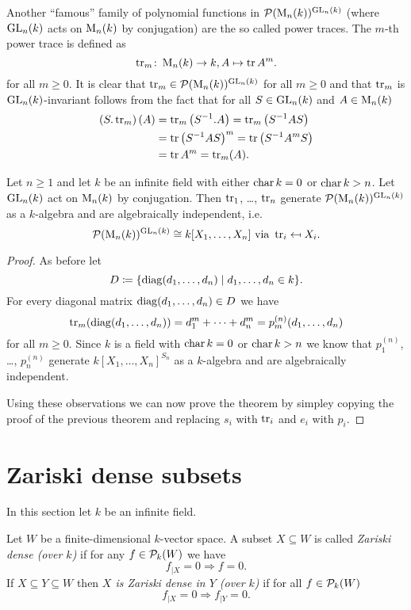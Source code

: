 Another ``famous'' family of polynomial functions in $\mathcal{P}(\operatorname{M}_n(k))^{\operatorname{GL}_n(k)}$ (where $\operatorname{GL}_n(k)$ acts on $\operatorname{M}_n(k)$ by conjugation) are the so called power traces. The $m$-th power trace is defined as
\[
  \operatorname{tr}_m \colon \operatorname{M}_n(k) \to k, A \mapsto \operatorname{tr} A^m.
\]
for all $m \geq 0$. It is clear that $\operatorname{tr}_m \in \mathcal{P}(\operatorname{M}_n(k))^{\operatorname{GL}_n(k)}$ for all $m \geq 0$ and that $\operatorname{tr}_m$ is $\operatorname{GL}_n(k)$-invariant follows from the fact that for all $S \in \operatorname{GL}_n(k)$ and $A \in \operatorname{M}_n(k)$
\begin{align*}
  \left(S.\operatorname{tr}_m\right)(A)
  &= \operatorname{tr}_m\left(S^{-1}.A\right)
  = \operatorname{tr}_m\left(S^{-1} A S\right) \\
  &= \operatorname{tr} \left(S^{-1} A S\right)^m
  = \operatorname{tr} \left(S^{-1} A^m S\right) \\
  &= \operatorname{tr} A^m
  = \operatorname{tr}_m(A).
\end{align*}


\begin{thrm}
  Let $n \geq 1$ and let $k$ be an infinite field with either $\operatorname{char} k = 0$ or $\operatorname{char} k > n$. Let $\operatorname{GL}_n(k)$ act on $\operatorname{M}_n(k)$ by conjugation. Then $\operatorname{tr}_1$, \dots, $\operatorname{tr}_n$ generate $\mathcal{P}(\operatorname{M}_n(k))^{\operatorname{GL}_n(k)}$ as a $k$-algebra and are algebraically independent, i.e.\
  \[
    \mathcal{P}(\operatorname{M}_n(k))^{\operatorname{GL}_n(k)} \cong k[X_1, \dotsc, X_n] \text{ via } \operatorname{tr}_i \mapsfrom X_i.
  \]
\end{thrm}
\begin{proof}
  As before let 
  \[
    D \coloneqq \{\operatorname{diag}(d_1, \dotsc, d_n) \mid d_1, \dotsc, d_n \in k\}.
  \]
  For every diagonal matrix $\operatorname{diag}(d_1, \dotsc, d_n) \in D$ we have
  \[
    \operatorname{tr}_m(\operatorname{diag}(d_1, \dotsc, d_n)) = d_1^m + \dotsb + d_n^m = p^{(n)}_m(d_1, \dotsc, d_n)
  \]
  for all $m \geq 0$. Since $k$ is a field with $\operatorname{char} k = 0$ or $\operatorname{char} k > n$ we know that $p^{(n)}_1$, \dots, $p^{(n)}_n$ generate $k[X_1, \dotsc, X_n]^{S_n}$ as a $k$-algebra and are algebraically independent.
  
  Using these observations we can now prove the theorem by simpley copying the proof of the previous theorem and replacing $s_i$ with $\operatorname{tr}_i$ and $e_i$ with $p_i$.
\end{proof}





\section{Zariski dense subsets}
In this section let $k$ be an infinite field.


\begin{defi}
  Let $W$ be a finite-dimensional $k$-vector space. A subset $X \subseteq W$ is called \emph{Zariski dense (over $k$)} if for any $f \in \mathcal{P}_k(W)$ we have
  \[
    f_{|X} = 0 \Rightarrow f = 0.
  \]
  If $X \subseteq Y \subseteq W$ then \emph{$X$ is Zariski dense in $Y$ (over $k$)} if for all $f \in \mathcal{P}_k(W)$
  \[
    f_{|X} = 0 \Rightarrow f_{|Y} = 0.
  \]
\end{defi}


